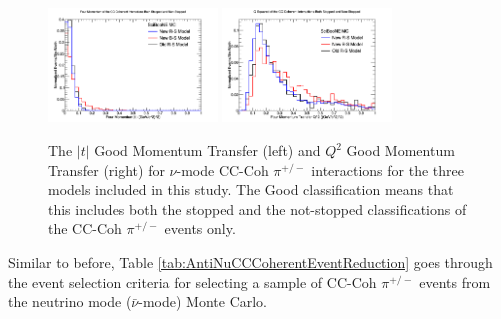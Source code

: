 \documentclass[11pt]{article}
\begin{document}
\begin{figure}[H]
\centering
\includegraphics[width=0.4\textwidth]{CCCohPlots/NMCCCohGoodT.png}
\includegraphics[width=0.4\textwidth]{CCCohPlots/NMCCCohGoodQ2.png}
\caption{The $|t|$ Good Momentum Transfer (left) and $Q^2$ Good Momentum Transfer (right) for $\nu$-mode CC-Coh $\pi^{+/-}$ interactions for the three models included in this study. The Good classification means that this includes both the stopped and the not-stopped classifications of the CC-Coh $\pi^{+/-}$ events only.}
\end{figure}\label{fig:AntiNuModeCCCohGoodTAndQ2}



Similar to before, Table \ref{tab:AntiNuCCCoherentEventReduction} goes through the event selection criteria for selecting a sample of CC-Coh $\pi^{+/-}$ events from the neutrino mode ($\bar{\nu}$-mode) Monte Carlo.
\end{document}
